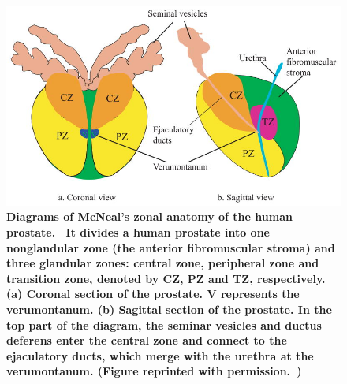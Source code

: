 \begin{figure}
\centering
\includegraphics[width=0.75\linewidth]{figs/Mcneal_Zonal_Anatomy.jpg}
\caption{\textbf{Diagrams of McNeal’s zonal anatomy of the human
    prostate.~\cite{mcneal_path} It divides a human prostate into one
    nonglandular zone (the anterior fibromuscular stroma) and three glandular
    zones: central zone, peripheral zone and transition zone, denoted by CZ, PZ
    and TZ, respectively. (a) Coronal section of the prostate. V represents the
    verumontanum. (b) Sagittal section of the prostate. In the top part of the
    diagram, the seminar vesicles and ductus deferens enter the central zone
    and connect to the ejaculatory ducts, which merge with the urethra at the
    verumontanum. (Figure reprinted with permission.~\cite{Zhai2010a})}}
\label{fig:mcneal_anatomy} 
\end{figure}
